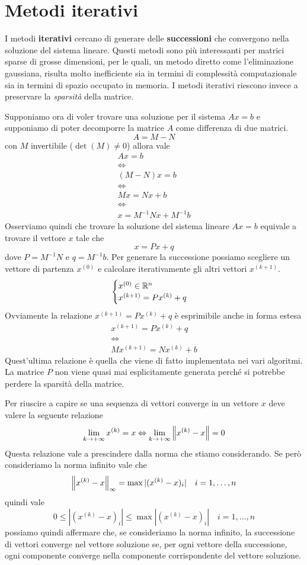 \chapter{Metodi iterativi}
I metodi \textbf{iterativi} cercano di generare delle \textbf{successioni} che convergono nella soluzione
del sistema lineare. Questi metodi sono più interessanti per matrici sparse di grosse dimensioni, per le quali,
un metodo diretto come l'eliminazione gaussiana, risulta molto inefficiente sia in termini di complessità
computazionale sia in termini di spazio occupato in memoria. I metodi iterativi riescono invece a preservare la
\emph{sparsità} della matrice.

Supponiamo ora di voler trovare una soluzione per il sistema $Ax = b$ e supponiamo di poter decomporre la matrice
$A$ come differenza di due matrici.
\[ A = M - N \]
con $M$ invertibile ($\det(M) \neq 0$) allora vale
\begin{gather*}
	Ax = b \\
	\Leftrightarrow \\
	(M - N) x = b \\
	\Leftrightarrow \\
	M x = N x + b \\
	\Leftrightarrow \\
	x = M^{-1} N x + M^{-1} b
\end{gather*}
Osserviamo quindi che trovare la soluzione del sistema lineare $Ax = b$ equivale a trovare il vettore $x$ tale che
\[ x = Px + q \]
dove $P = M^{-1} N$ e $q = M^{-1} b$. Per generare la successione possiamo scegliere un vettore di partenza
$x^{(0)}$ e calcolare iterativamente gli altri vettori $x^{(k+1)}$.
\[
	\begin{cases}
		x^{(0)} \in \mathbb{R}^n \\
		x^{(k+1)} = P x^{(k)} + q
	\end{cases}
\]
Ovviamente la relazione $x^{(k+1)} = P x^{(k)} + q$ è esprimibile anche in forma estesa
\begin{gather*}
	x^{(k+1)} = P x^{(k)} + q \\
	\Leftrightarrow         \\
	M x^{(k+1)} = N x^{(k)} + b
\end{gather*}
Quest'ultima relazione è quella che viene di fatto implementata nei vari algoritmi. La matrice $P$ non viene quasi
mai esplicitamente generata perché si potrebbe perdere la sparsità della matrice.

Per riuscire a capire se una sequenza di vettori converge in un vettore $x$ deve valere la seguente relazione
\[ \lim_{k \to +\infty} x^{(k)} = x \Leftrightarrow \lim_{k \to +\infty} \left\lVert x^{(k)} - x\right\rVert = 0 \]
Questa relazione vale a prescindere dalla norma che stiamo considerando. Se però consideriamo la norma infinito
vale che
\[ \left\lVert x^{(k)} - x\right\rVert_\infty = \max | (x^{(k)} - x)_i | \quad i = 1, \dots, n \]
quindi vale
\[ 0 \leq | (x^{(k)} - x)_i | \leq \max | (x^{(k)} - x)_i | \quad i = 1, \dots, n \]
possiamo quindi affermare che, se consideriamo la norma infinito, la successione di vettori converge nel vettore
soluzione se, per ogni vettore della successione, ogni componente converge nella componente corrispondente del
vettore soluzione.

